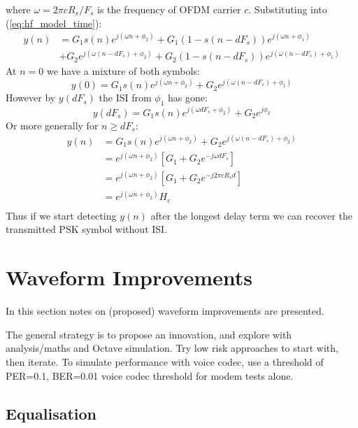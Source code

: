 \documentclass{article}
\begin{document}
where $\omega=2 \pi c R_s/F_s$ is the frequency of OFDM carrier $c$.  Substituting into (\ref{eq:hf_model_time}): 
\begin{equation}
\begin{split}
y(n) &= G_1s(n)e^{j (\omega n + \phi_2)} + G_1(1-s(n-dF_s))e^{j (\omega n + \phi_1)} \\
     &+ G_2e^{j (\omega (n-dF_s) + \phi_2)} + G_2(1-s(n-dF_s))e^{j (\omega (n-dF_s) + \phi_1)}
\end{split}
\end{equation}
At $n=0$ we have a mixture of both symbols:
\begin{equation}
y(0) = G_1s(n)e^{j (\omega n + \phi_2)} + G_2e^{j (\omega (n-dF_s) + \phi_1)}
\end{equation}
However by $y(dF_s)$ the ISI from $\phi_1$ has gone:
\begin{equation}
y(dF_s) = G_1s(n)e^{j (\omega dF_s + \phi_2)} + G_2e^{j \phi_2}
\end{equation}
Or more generally for $n \ge dF_s$:
\begin{equation}
\begin{split}
y(n) &= G_1s(n)e^{j (\omega n + \phi_2)} + G_2e^{j (\omega (n-dF_s) + \phi_2)} \\
     &= e^{j (\omega n + \phi_2)} [ G_1 + G_2 e^{-j \omega dF_s } ] \\
     &= e^{j (\omega n + \phi_2)} [ G_1 + G_2 e^{-j  2 \pi c R_s d} ] \\
     &= e^{j (\omega n + \phi_2)} H_c \\
\end{split}
\end{equation}
Thus if we start detecting $y(n)$ after the longest delay term we can recover the transmitted PSK symbol without ISI.

\section{Waveform Improvements}

In this section notes on (proposed) waveform improvements are presented.

The general strategy is to propose an innovation, and explore with analysis/maths and Octave simulation. Try low risk approaches to start with, then iterate.  To simulate performance with voice codec, use a threshold of PER=0.1, BER=0.01 voice codec threshold for modem tests alone.

\subsection{Equalisation}
\end{document}
